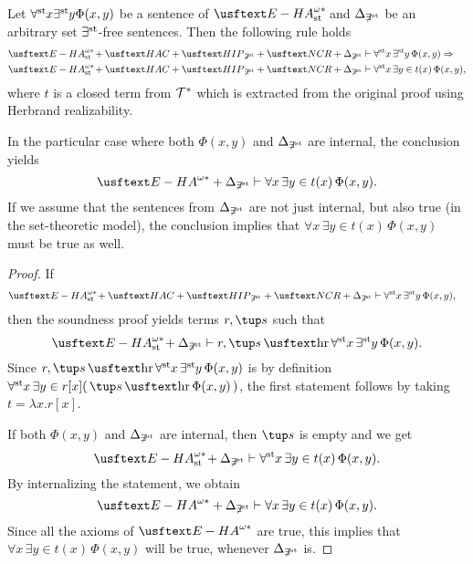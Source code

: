 \begin{thm} Let $\forall^{\operatorname{st}{}}\! x \exists^{\operatorname{st}{}}\! y \Phi(x, y)$ be a sentence of $\ehaststar$ and $\Delta_{\not\exists^{\operatorname{st}}}$ be an arbitrary set $\exists^{\operatorname{st}{}}\!$-free sentences. Then the following rule holds
\begin{align*}
\ehaststar + \HAC + \HIP_{\not\exists^{\st}} + \NCR + \Delta_{\not\exists^{\st}} & \vdash \forallst x \, \existsst y \, \Phi(x, y) \Rightarrow \\
\ehaststar + \HAC + \HIP_{\not\exists^{\st}} + \NCR + \Delta_{\not\exists^{\st}} & \vdash \forallst x \, \exists y \in  t(x) \, \Phi(x, y),
\end{align*}
where $t$ is a closed term from $\mathcal{T}^*$ which is extracted from the original proof using Herbrand realizability.

In the particular case where both $\Phi(x, y)$ and $\Delta_{\not\exists^{\operatorname{st}}}$ are internal, the conclusion yields
\[ \ehastar + \Delta_{\not\exists^{\st}} \vdash \forall x \,  \exists y \in t(x) \, \Phi(x, y). \]
If we assume that the sentences from $\Delta_{\not\exists^{\operatorname{st}}}$ are not just internal, but also true (in the set-theoretic model), the conclusion implies that $\forall x \,  \exists y \in t(x) \, \Phi(x, y)$ must be true as well.
\end{thm}
\begin{proof}
If
\begin{align*}
\ehaststar + \HAC + \HIP_{\not\exists^{\st}} + \NCR + \Delta_{\not\exists^{\st}} & \vdash \forallst x \, \existsst y \, \Phi(x, y),
\end{align*}
then the soundness proof yields terms $r, \tup s$ such that
\[ \ehaststar + \Delta_{\not\exists^{\st}} \vdash r, \tup s \hr \forallst x \, \existsst y \, \Phi(x, y). \]
Since $r, \tup s \hr \forallst x \, \existsst y \, \Phi(x, y)$ is by definition $\forallst x \, \exists y \in r[x] ( \, \tup s \hr \Phi(x, y) \,)$, the first statement follows by taking $t = \lambda x. r[x]$.

If both $\Phi(x, y)$ and $\Delta_{\not\exists^{\operatorname{st}}}$ are internal, then $\tup s$ is empty and we get
\[ \ehaststar + \Delta_{\not\exists^{\st}} \vdash \forallst x \,  \exists y \in t(x) \, \Phi(x, y). \]
By internalizing the statement, we obtain
\[ \ehastar + \Delta_{\not\exists^{\st}} \vdash \forall x \,  \exists y \in t(x) \, \Phi(x, y). \]
Since all the axioms of $\ehastar$ are true, this implies that $\forall x \,  \exists y \in t(x) \, \Phi(x, y)$ will be true, whenever $\Delta_{\not\exists^{\operatorname{st}}}$ is.
\end{proof}

